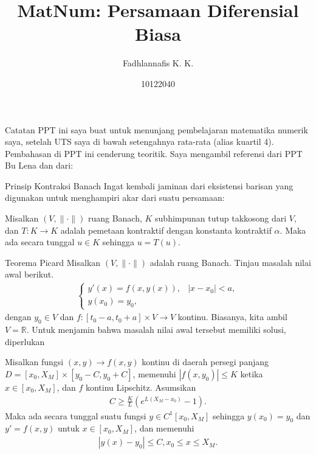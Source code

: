 \documentclass[xcolor={dvipsnames}, 9pt]{beamer}
\title{MatNum: Persamaan Diferensial Biasa}
\author{Fadhlannafis K. K.}
\date{10122040}
\begin{document}
	\begin{frame}[plain]
		\maketitle
	\end{frame}
	\begin{frame}{Catatan}
		PPT ini saya buat untuk menunjang pembelajaran matematika numerik saya, setelah UTS saya di bawah setengahnya rata-rata (alias kuartil 4). \newline
		Pembahasan di PPT ini cenderung teoritik. Saya mengambil referensi dari PPT Bu Lena dan dari:
		\nocite{*}
		\printbibliography
    \end{frame}
    \begin{frame}{Prinsip Kontraksi Banach}
        Ingat kembali jaminan dari eksistensi barisan yang digunakan untuk menghampiri akar dari suatu persamaan:
        \begin{theorem}
            Misalkan $(V,\|\cdot\|)$ ruang Banach, $K$ subhimpunan tutup takkosong dari $V$, dan $T:K\to K$ adalah pemetaan kontraktif dengan konstanta kontraktif $\alpha$. Maka ada secara tunggal $u\in K$ sehingga $u=T(u)$. 
        \end{theorem}
    \end{frame}
    \begin{frame}{Teorema Picard}
        Misalkan $(V,\|\cdot\|)$ adalah ruang Banach. Tinjau masalah nilai awal berikut.
        \begin{align}\label{ivp}
            \begin{cases}
                y'(x) = f(x,y(x)), & |x-x_0| < a, \\
                y(x_0) = y_0,
            \end{cases}
        \end{align}
        dengan $y_0\in V$ dan $f:[t_0-a,t_0+a]\times V\to V$ kontinu. Biasanya, kita ambil $V=\mathbb{R}$. Untuk menjamin bahwa masalah nilai awal tersebut memiliki solusi, diperlukan
        \begin{theorem}[Picard]
            Misalkan fungsi $(x,y)\to f(x,y)$ kontinu di daerah persegi panjang $D = [x_0,X_M] \times [y_0-C, y_0+C]$, memenuhi $|f(x,y_0)|\leq K$ ketika $x\in[x_0,X_M]$, dan $f$ kontinu Lipschitz. Asumsikan
            \begin{align*}
                C\geq \frac{K}{L}\left(e^{L(X_M-x_0)}-1\right).
            \end{align*}
            Maka ada secara tunggal suatu fungsi $y\in C^1[x_0,X_M]$ sehingga $y(x_0)=y_0$ dan $y'=f(x,y)$ untuk $x\in [x_0, X_M]$, dan memenuhi
            \begin{align*}
                |y(x)-y_0|\leq C, x_0\leq x\leq X_M.
            \end{align*}
        \end{theorem}
    \end{frame}
\end{document}
